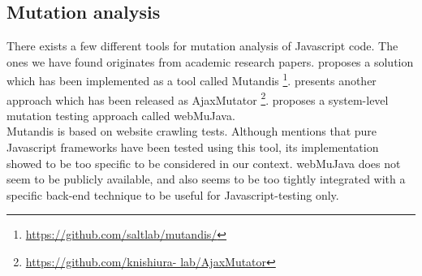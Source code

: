 \subsection{Mutation analysis}
\label{sec:choices_mutation}

There exists a few different tools for mutation analysis of Javascript
code. The ones we have found originates from academic research papers.
\citet{paper:mutandis} proposes a solution which has been implemented as
a tool called Mutandis
\footnote{\url{https://github.com/saltlab/mutandis/}}.
\citet{paper:ajaxmutator} presents another approach which has been
released as AjaxMutator \footnote{\url{https://github.com/knishiura-
lab/AjaxMutator}}. \citet{paper:webmujava} proposes a system-level
mutation testing approach called webMuJava.\\

Mutandis is based on website crawling tests. Although
\citeauthor{paper:mutandis} mentions that pure Javascript frameworks
have been tested using this tool, its implementation showed to be too
specific to be considered in our context. webMuJava does not seem to be
publicly available, and also seems to be too tightly integrated with a
specific back-end technique to be useful for Javascript-testing only.
